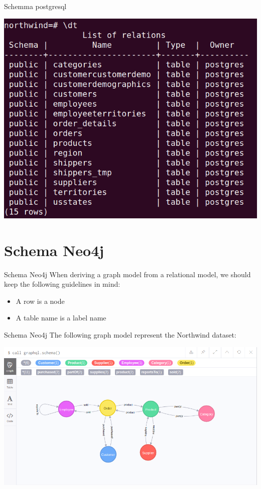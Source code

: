 \documentclass{beamer}
\begin{document}
\begin{frame}{Schemma postgresql}{ }	
\begin{center}
	\includegraphics[width=0.7\linewidth]{img/postgresql.png}
\end{center}
\end{frame}


\section{Schema Neo4j}

\begin{frame}{Schema Neo4j}{ }
	When deriving a graph model from a relational model, we should keep the following guidelines in mind:
\begin{itemize}	

		\item A row is a node
		\item A table name is a label name
\end{itemize}

\end{frame}

\begin{frame}{Schema Neo4j}{ }
	The following graph model represent the Northwind dataset:	
\begin{center}
	\includegraphics[width=1.0\linewidth]{img/graph.png}
\end{center}
\end{frame}
\end{document}
